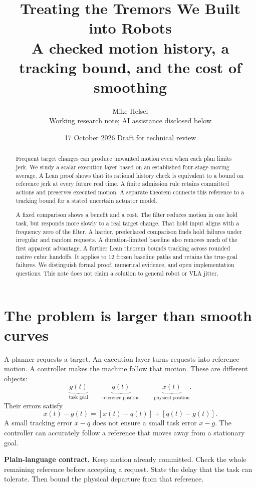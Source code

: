 \documentclass[11pt,letterpaper]{article}
\title{\vspace{-1.5em}\textbf{Treating the Tremors We Built into Robots}\\[.4em]
\large A checked motion history, a tracking bound, and the cost of smoothing}
\author{Mike Helsel\\[-.2em]\small Working research note; AI assistance disclosed below}
\date{17 October 2026 \quad Draft for technical review}
\begin{document}
\maketitle
\vspace{-1em}
\begin{abstract}
Frequent target changes can produce unwanted motion even when each plan limits jerk. We study a scalar execution layer based on an established four-stage moving average. A Lean proof shows that its rational history check is equivalent to a bound on reference jerk at every future real time. A finite admission rule retains committed actions and preserves executed motion. A separate theorem connects this reference to a tracking bound for a stated uncertain actuator model.

A fixed comparison shows a benefit and a cost. The filter reduces motion in one hold task, but responds more slowly to a real target change. That hold input aligns with a frequency zero of the filter. A harder, predeclared comparison finds hold failures under irregular and random requests. A duration-limited baseline also removes much of the first apparent advantage. A further Lean theorem bounds tracking across rounded native cubic handoffs. It applies to 12 frozen baseline paths and retains the true-goal failures. We distinguish formal proof, numerical evidence, and open implementation questions. This note does not claim a solution to general robot or VLA jitter.
\end{abstract}
\section{The problem is larger than smooth curves}
A planner requests a target. An execution layer turns requests into reference motion. A controller makes the machine follow that motion. These are different objects:
\[
\underbrace{g(t)}_{\text{task goal}}\qquad
\underbrace{q(t)}_{\text{reference position}}\qquad
\underbrace{x(t)}_{\text{physical position}}.
\]
Their errors satisfy
\begin{equation}\label{split}
x(t)-g(t)=[x(t)-q(t)]+[q(t)-g(t)].
\end{equation}
A small tracking error $x-q$ does not ensure a small task error $x-g$. The controller can accurately follow a reference that moves away from a stationary goal.

\textbf{Plain-language contract.} Keep motion already committed. Check the whole remaining reference before accepting a request. State the delay that the task can tolerate. Then bound the physical departure from that reference.
\end{document}

